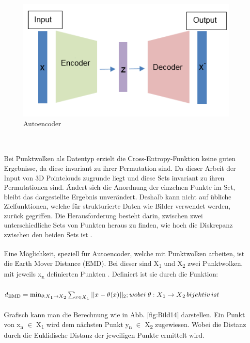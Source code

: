 \documentclass{llncs}
\begin{document}
\begin{figure}[htbp] 
	\centering
	\includegraphics[width=1.0\textwidth]{autoencoder2.png}
	\caption{Autoencoder}
	\label{fig:Bild13}
\end{figure}
~\\\\
Bei Punktwolken als Datentyp erzielt die Cross-Entropy-Funktion keine guten Ergebnisse, da diese invariant zu ihrer Permutation sind. Da dieser Arbeit der Input von 3D Pointclouds zugrunde liegt und diese Sets  invariant zu ihren Permutationen sind. Ändert sich die Anordnung der einzelnen Punkte im Set, bleibt das dargestellte Ergebnis unverändert.  Deshalb kann nicht auf übliche Zielfunktionen, welche für strukturierte Daten wie Bilder verwendet werden, zurück gegriffen. Die Herausforderung besteht darin, zwischen zwei unterschiedliche Sets von Punkten heraus zu finden, wie hoch die Diskrepanz zwischen den beiden Sets ist \cite{invariant}. 
\\\\
Eine Möglichkeit, speziell für Autoencoder, welche mit Punktwolken arbeiten, ist die Earth Mover Distance (EMD). Bei dieser sind X\textsubscript{1} und X\textsubscript{2} zwei Punktwolken, mit jeweils x\textsubscript{n} definierten Punkten \cite{autoencoderloss}. Definiert ist sie durch die Funktion:
\\\\
\begin{math}
d\textsubscript{EMD}=\min_{\theta : X\textsubscript{1}\rightarrow X\textsubscript{2}}  \sum_{x\in X\textsubscript{1}}|| x - \theta(x)||\textsubscript{2};wobei\;\theta: X\textsubscript{1} \rightarrow X\textsubscript{2}\, bijektiv\, ist 
\end{math}
\\\\
Grafisch kann man die Berechnung wie in Abb. \ref{fig:Bild14} darstellen. Ein Punkt von x\textsubscript{n} $\in$ X\textsubscript{1} wird dem nächsten Punkt y\textsubscript{n} $\in$  X\textsubscript{2} zugewiesen. Wobei die Distanz durch die Euklidische Distanz der jeweiligen Punkte ermittelt wird. 
\end{document}
